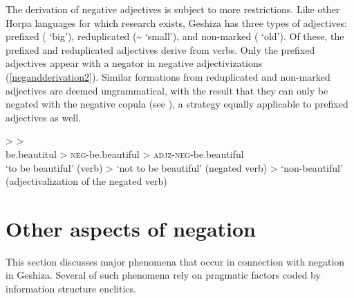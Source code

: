 \documentclass[output=paper,colorlinks,citecolor=brown]{langscibook}
\begin{document}

The derivation of negative adjectives is subject to more restrictions. Like other Horpa languages for which research exists, Geshiza has three types of adjectives: prefixed ( `big'), reduplicated (\textasciitilde {} `small'), and non-marked ( `old'). Of these, the prefixed and reduplicated adjectives derive from verbs. Only the prefixed adjectives appear with a negator in negative adjectivizations (\ref{negandderivation2}). Similar formations from reduplicated and non-marked adjectives are deemed ungrammatical, with the result that they can only be negated with the negative copula (see ), a strategy equally applicable to prefixed adjectives as well.

\ea
\label{negandderivation2}
\gll  {} >  > \\ 
be.beautitul  > \textsc{neg}-be.beautiful > \textsc{adjz-neg}-be.beautiful\\
\glt `to be beautiful’ (verb) > `not to be beautiful' (negated verb) > `non-beautiful' (adjectivalization of the negated verb)
\z


\section{Other aspects of negation}
This section discusses major phenomena that occur in connection with negation in Geshiza. Several of such phenomena rely on pragmatic factors coded by information structure enclitics.
\end{document}
